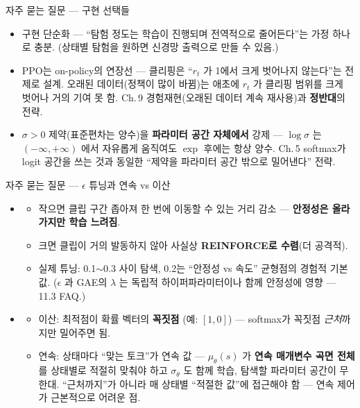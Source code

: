 \documentclass[aspectratio=169,11pt]{beamer}
\begin{document}
\begin{frame}{자주 묻는 질문 — 구현 선택들}
  \small
  \begin{itemize}
    \item {}
      구현 단순화 — ``탐험 정도는 학습이 진행되며 전역적으로
      줄어든다''는 가정 하나로 충분. (상태별 탐험을 원하면 신경망
      출력으로 만들 수 있음.)
    \item {}
      PPO는 on-policy의 연장선 — 클리핑은 ``$r_t$ 가 1에서 크게
      벗어나지 않는다''는 전제로 설계. 오래된 데이터(정책이 많이
      바뀜)는 애초에 $r_t$ 가 클리핑 범위를 크게 벗어나 거의
      기여 못 함. Ch.\,9 경험재현(오래된 데이터 계속 재사용)과
      \textbf{정반대}의 전략.
    \item {}
      $\sigma>0$ 제약(표준편차는 양수)을 \textbf{파라미터 공간
      자체에서} 강제 — $\log\sigma$ 는 $(-\infty,+\infty)$
      에서 자유롭게 움직여도 $\exp$ 후에는 항상 양수.
      Ch.\,5 softmax가 logit 공간을 쓰는 것과 동일한 ``제약을
      파라미터 공간 밖으로 밀어낸다'' 전략.
  \end{itemize}
\end{frame}

\begin{frame}{자주 묻는 질문 — $\epsilon$ 튜닝과 연속 vs 이산}
  \small
  \begin{itemize}
    \item {}
      \begin{itemize}
        \item 작으면 클립 구간 좁아져 한 번에 이동할 수 있는
          거리 감소 — \textbf{안정성은 올라가지만 학습 느려짐}.
        \item 크면 클립이 거의 발동하지 않아 사실상
          \textbf{REINFORCE로 수렴}(더 공격적).
        \item 실제 튜닝: 0.1$\sim$0.3 사이 탐색, 0.2는
          ``안정성 vs 속도'' 균형점의 경험적 기본값.
          ($\epsilon$ 과 GAE의 $\lambda$ 는 독립적
          하이퍼파라미터이나 함께 안정성에 영향 — 11.3 FAQ.)
      \end{itemize}
    \item {}
      \begin{itemize}
        \item 이산: 최적점이 확률 벡터의 \textbf{꼭짓점}
          (예: $[1,0]$) — softmax가 꼭짓점 \textit{근처}까지만
          밀어주면 됨.
        \item 연속: 상태마다 ``맞는 토크''가 연속 값 —
          $\mu_\theta(s)$ 가 \textbf{연속 매개변수 곡면 전체}를
          상태별로 적절히 맞춰야 하고 $\sigma_\theta$ 도 함께
          학습, 탐색할 파라미터 공간이 무한대. ``근처까지''가
          아니라 매 상태별 ``적절한 값''에 접근해야 함 —
          연속 제어가 근본적으로 어려운 점.
      \end{itemize}
  \end{itemize}
\end{frame}
\end{document}
